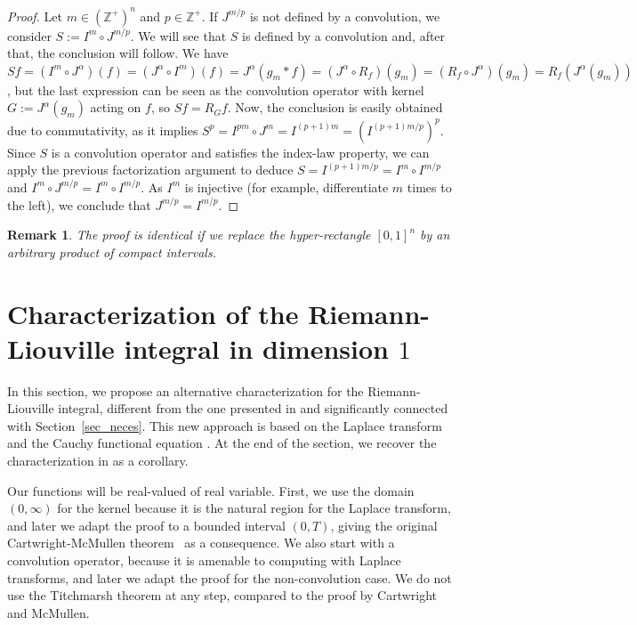 \documentclass[12pt,reqno]{amsart}
\theoremstyle{plain}
\newtheorem{remark}[theorem]{Remark}
\numberwithin{equation}{section} %
\begin{document}
\begin{proof}
Let $m \in (\mathbb{Z}^+)^n$ and $p \in \mathbb{Z}^+$. If $J^{m/p}$ is not defined by a convolution, we consider $S:=I^{m} \circ J^{m/p}$. We will see that $S$ is defined by a convolution and, after that, the conclusion will follow. We have $Sf=(I^m \circ J^\alpha)(f)=(J^\alpha \circ I^m)(f)=J^{\alpha}(g_m \ast f)=(J^{\alpha} \circ R_f)(g_m)=(R_f \circ J^{\alpha})(g_m)=R_f(J^{\alpha}(g_m))$, but the last expression can be seen as the convolution operator with kernel $G:=J^{\alpha}(g_m)$ acting on $f$, so $S f= R_{G}f$. Now, the conclusion is easily obtained due to commutativity, as it implies $S^p=I^{p m}\circ J^{m}=I^{(p+1)m}=(I^{(p+1)m/p})^p$. Since $S$ is a convolution operator and satisfies the index-law property, we can apply the previous factorization argument to deduce $S=I^{(p+1)m/p}=I^{m} \circ I^{m/p}$ and $I^{m} \circ J^{m/p}=I^{m} \circ I^{m/p}$. As $I^m$ is injective (for example, differentiate $m$ times to the left), we conclude that $J^{m/p}=I^{m/p}$.
\end{proof}

\begin{remark} \normalfont 
The proof is identical if we replace the hyper-rectangle $[0,1]^n$ by an arbitrary product of compact intervals.
\end{remark}

\section{Characterization of the Riemann-Liouville integral in dimension $1$} \label{seci4}

In this section, we propose an alternative characterization for the Riemann-Liouville integral, different from the one presented in \cite{cart} and significantly connected with Section~\ref{sec_neces}. This new approach is based on the Laplace transform \cite[Appendix D.3]{diethelm} and the Cauchy functional equation \cite[Chapter~3]{saaty}. At the end of the section, we recover the characterization in \cite{cart} as a corollary.

Our functions will be real-valued of real variable. First, we use the domain $(0,\infty)$ for the kernel because it is the natural region for the Laplace transform, and later we adapt the proof to a bounded interval $(0,T)$, giving the original Cartwright-McMullen theorem~\cite{cart} as a consequence. We also start with a convolution operator, because it is amenable to computing with Laplace transforms, and later we adapt the proof for the non-convolution case. We do not use the Titchmarsh theorem at any step, compared to the proof by Cartwright and McMullen.
\end{document}
